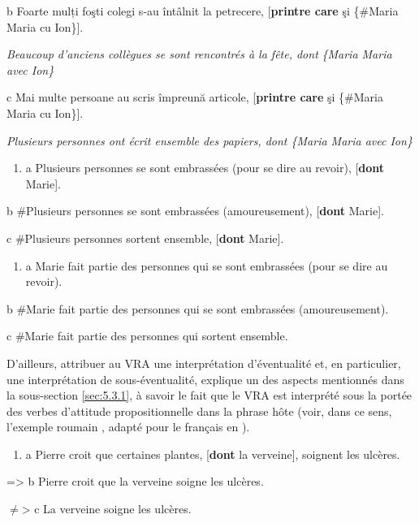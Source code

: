   b  Foarte mulți foşti colegi s-au întâlnit la petrecere, [\textbf{printre care} şi \{\#Maria {\textbar} Maria cu Ion\}].

\textit{Beaucoup d'anciens collègues se sont rencontrés à la fête, dont} \textit{\{}\textit{Maria {\textbar} Maria avec Ion\}}

  c  Mai multe persoane au scris împreună articole, [\textbf{printre care} şi \{\#Maria {\textbar} Maria cu Ion\}].

    \textit{Plusieurs personnes ont écrit ensemble des papiers, dont \{Maria {\textbar} Maria avec Ion\}}


\begin{enumerate}
\item a  Plusieurs personnes se sont embrassées (pour se dire au revoir), [\textbf{dont} Marie]. 


\end{enumerate}
  b  \#Plusieurs personnes se sont embrassées (amoureusement), [\textbf{dont} Marie].

  c  \#Plusieurs personnes sortent ensemble, [\textbf{dont} Marie].


\begin{enumerate}
\item a  Marie fait partie des personnes qui se sont embrassées (pour se dire au revoir).


\end{enumerate}
  b  \#Marie fait partie des personnes qui se sont embrassées (amoureusement).

  c  \#Marie fait partie des personnes qui sortent ensemble.

D'ailleurs, attribuer au VRA une interprétation d'éventualité et, en particulier, une interprétation de sous-éventualité, explique un des aspects mentionnés dans la sous-section \ref{sec:5.3.1}, à savoir le fait que le VRA est interprété sous la portée des verbes d'attitude propositionnelle dans la phrase hôte (voir, dans ce sens, l'exemple roumain , adapté pour le français en ).


\begin{enumerate}
\item \label{bkm:Ref295412799}a  Pierre croit que certaines plantes, [\textbf{dont} la verveine], soignent les ulcères.


\end{enumerate}
={\textgreater}  b  Pierre croit que la verveine soigne les ulcères.

${\neq}${\textgreater}  c  La verveine soigne les ulcères.

